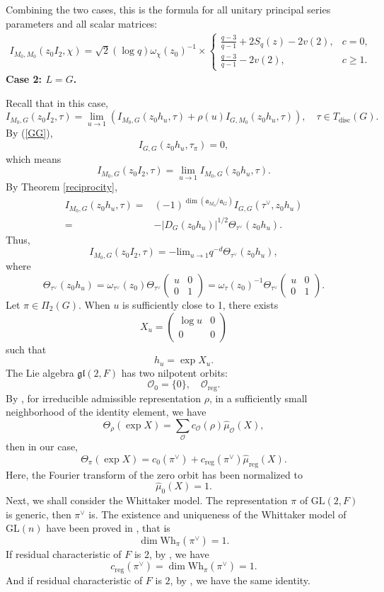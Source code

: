 \documentclass[11pt]{amsart}
\renewcommand{\rm}{\mathrm}
\newcommand{\GGL}{\mathrm{GL}}
\theoremstyle{definition}
\numberwithin{equation}{section}
\begin{document}
	Combining the two cases, this is the formula for all unitary principal series parameters and all scalar matrices:
	\begin{align*}
		I_{M_0,M_0}(z_0 I_2, \chi) = \sqrt{2}(\log q) \omega_\chi(z_0)^{-1} \times\begin{cases} \frac{q-3}{q-1} + 2S_q(z) - 2v(2), & c=0, \\ \frac{q-3}{q-1} - 2v(2), & c \ge 1. \end{cases}
	\end{align*}
	\textbf{Case 2: \(L=G\).}
	
	
	Recall that in this case, \[
	I_{M_0,G}(z_0I_2, \tau) = \lim_{u \to 1} \left( I_{M_0,G}(z_0h_u, \tau) + \rho(u) I_{G,M_0}(z_0h_u, \tau) \right), \quad \tau \in T_{\mathrm{disc}}(G).
	\]By (\ref{GG}),
	\[I_{G,G}(z_0h_u,\tau_\pi)=0,\]
	which means \[I_{M_0,G}(z_0I_2, \tau) =\lim_{u \to 1} I_{M_0,G}(z_0h_u, \tau).\]
	By Theorem \ref{reciprocity}, 
	\begin{align*}
		I_{M_0,G}(z_0h_u, \tau) =& (-1)^{\dim(\mathfrak{a}_{M_0} / \mathfrak{a}_G)} I_{G,G}(\tau^\vee, z_0h_u)\\
		=&-|D_G(z_0h_u)|^{1/2} \Theta_{\tau^\vee}(z_0h_u).
	\end{align*}
	Thus,
	\[I_{M_0,G}(z_0I_2, \tau) =-\rm{lim}_{u\to1}q^{-d}\Theta_{\tau^\vee}(z_0h_u) ,\]where \[\Theta_{\tau^\vee}(z_0h_u) = \omega_{\tau^\vee}(z_0) \Theta_{\tau^\vee} \begin{pmatrix} u & 0 \\ 0 & 1 \end{pmatrix} = \omega_{\tau}(z_0)^{-1} \Theta_{\tau^\vee} \begin{pmatrix} u & 0 \\ 0 & 1 \end{pmatrix}.\]
	Let \(\pi \in \Pi_2(G)\).
	When \(u\) is sufficiently close to 1, there exists
	\[
	X_u = \begin{pmatrix} \log u & 0 \\ 0 & 0 \end{pmatrix}
	\]
	such that
	\[
	h_u = \exp X_u.
	\]
	The Lie algebra \(\mathfrak{gl}(2,F)\) has two nilpotent orbits:
	\[
	\mathcal{O}_0 = \{0\}, \quad \mathcal{O}_{\mathrm{reg}}.
	\]
	By \cite{Howe}, for irreducible admissible representation \(\rho\), in a sufficiently small neighborhood of the identity element, we have
	\[\Theta_\rho(\exp X) = \sum_{\mathcal{O}} c_{\mathcal{O}}(\rho) \widehat{\mu}_{\mathcal{O}}(X),\]then in our case,
	\[
	\Theta_\pi(\exp X) = c_0(\pi^\vee) + c_{\mathrm{reg}}(\pi^\vee) \widehat{\mu}_{\mathrm{reg}}(X).
	\]
	Here, the Fourier transform of the zero orbit has been normalized to
	\[
	\widehat{\mu}_0(X) = 1.
	\]
	Next, we shall consider the Whittaker model. The representation \(\pi\) of \(\GGL(2,F)\) is generic, then \(\pi^\vee\) is. The existence and uniqueness of the Whittaker model of \(\GGL(n)\) have been proved in \cite{shal}, that is
	\[
	\dim \mathrm{Wh}_\pi(\pi^\vee) = 1.
	\]
	If residual characteristic of \(F\) is \(2\), by \cite{MW87}, we have
	\[c_{\mathrm{reg}}(\pi^\vee) = \dim \mathrm{Wh}_\pi(\pi^\vee) = 1.\]And if residual characteristic of \(F\) is \(2\), by \cite{Var14}, we have the same identity.
	
\end{document}
